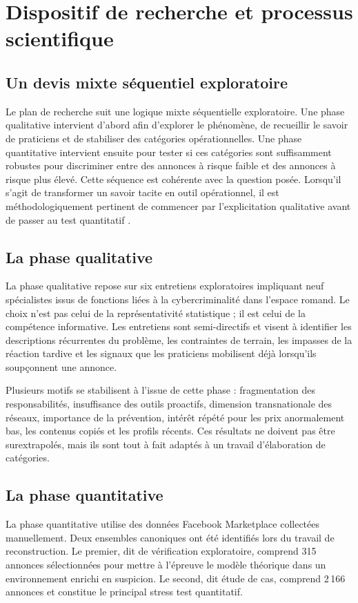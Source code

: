 \documentclass[10pt,a4paper]{article}
\begin{document}
\section{Dispositif de recherche et processus scientifique}
\subsection{Un devis mixte séquentiel exploratoire}
Le plan de recherche suit une logique mixte séquentielle exploratoire. Une phase qualitative intervient d'abord afin d'explorer le phénomène, de recueillir le savoir de praticiens et de stabiliser des catégories opérationnelles. Une phase quantitative intervient ensuite pour tester si ces catégories sont suffisamment robustes pour discriminer entre des annonces à risque faible et des annonces à risque plus élevé. Cette séquence est cohérente avec la question posée. Lorsqu'il s'agit de transformer un savoir tacite en outil opérationnel, il est méthodologiquement pertinent de commencer par l'explicitation qualitative avant de passer au test quantitatif \cite{fortin2022,thomas2006}.

\subsection{La phase qualitative}
La phase qualitative repose sur six entretiens exploratoires impliquant neuf spécialistes issus de fonctions liées à la cybercriminalité dans l'espace romand. Le choix n'est pas celui de la représentativité statistique ; il est celui de la compétence informative. Les entretiens sont semi-directifs et visent à identifier les descriptions récurrentes du problème, les contraintes de terrain, les impasses de la réaction tardive et les signaux que les praticiens mobilisent déjà lorsqu'ils soupçonnent une annonce.

Plusieurs motifs se stabilisent à l'issue de cette phase : fragmentation des responsabilités, insuffisance des outils proactifs, dimension transnationale des réseaux, importance de la prévention, intérêt répété pour les prix anormalement bas, les contenus copiés et les profils récents. Ces résultats ne doivent pas être surextrapolés, mais ils sont tout à fait adaptés à un travail d'élaboration de catégories.

\subsection{La phase quantitative}
La phase quantitative utilise des données Facebook Marketplace collectées manuellement. Deux ensembles canoniques ont été identifiés lors du travail de reconstruction. Le premier, dit de vérification exploratoire, comprend 315 annonces sélectionnées pour mettre à l'épreuve le modèle théorique dans un environnement enrichi en suspicion. Le second, dit étude de cas, comprend 2\,166 annonces et constitue le principal stress test quantitatif.
\end{document}
